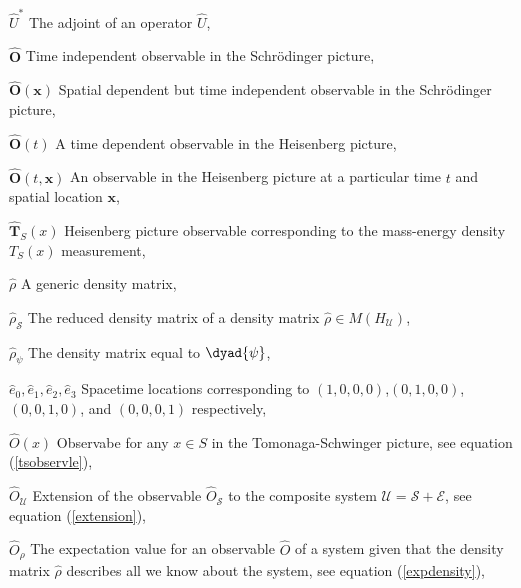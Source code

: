 \begin{thenomenclature}
  \item [{$\hat {U}^*$}]\begingroup The adjoint of an operator $\hat {U}$, \nomrefpage {}
  \item [{$\hat{\bm{O}}$}]\begingroup Time independent observable in the Schr\"{o}dinger picture, \nomrefpage{}
  \item [{$\hat{\bm{O}}(\bm{x})$}]\begingroup Spatial dependent but time independent observable in the Schr\"{o}dinger picture, \nomrefpage{}
  \item [{$\hat{\bm{O}}(t)$}]\begingroup A time dependent observable in the Heisenberg picture, \nomrefpage{}
  \item [{$\hat{\bm{O}}(t, \bm{x})$}]\begingroup An observable in the Heisenberg picture at a particular time $t$ and spatial location $\bm{x}$, \nomrefpage{}
  \item [{$\hat{\bm{T}}_S(x)$}]\begingroup Heisenberg picture observable corresponding to the  mass-energy density $T_S(x)$ measurement, \nomrefpage{}
  \item [{$\hat{\rho}$}]\begingroup A generic density matrix, \nomrefpage{}
  \item [{$\hat{\rho}_\mathcal{S}$}]\begingroup The reduced density matrix of a density matrix $\hat{\rho}\in M(H_\mathcal{U})$, \nomrefpage{}
  \item [{$\hat{\rho}_\psi$}]\begingroup The density matrix equal to $\dyad{\psi}$, \nomrefpage{}
  \item [{$\hat{e}_0, \hat{e}_1, \hat{e}_2, \hat{e}_3$}]\begingroup Spacetime locations corresponding to $(1,0,0,0)$,$(0,1,0,0)$, $(0,0,1,0)$, and $(0,0,0,1)$ respectively, \nomrefpage{}
  \item [{$\hat{O}(x)$}]\begingroup Observabe for any $x\in S$ in the Tomonaga-Schwinger picture, see equation (\ref{tsobservle}), \nomrefpage{}
  \item [{$\hat{O}_\mathcal{U}$}]\begingroup Extension of the observable $\hat{O}_{\mathcal{S}}$ to the composite system $\mathcal{U}=\mathcal{S}+\mathcal{E}$, see equation (\ref{extension}),  \nomrefpage{}
  \item [{$\hat{O}_\rho$}]\begingroup The expectation value  for an observable $\hat{O}$ of a system given that the density matrix $\hat{\rho}$ describes all we know about the system, see equation (\ref{expdensity}), \nomrefpage{}

\end{thenomenclature}
